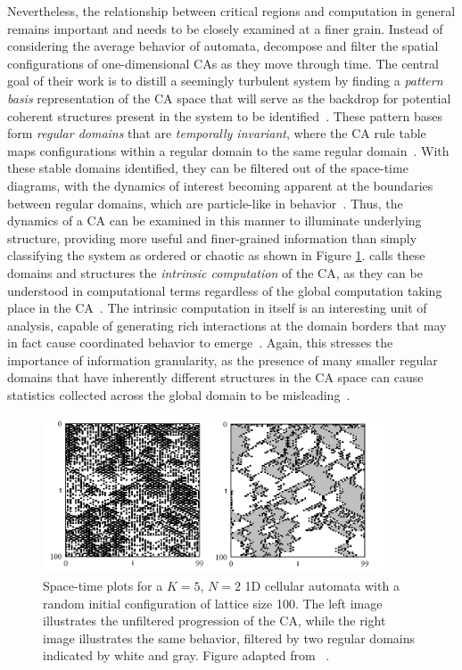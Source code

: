 \documentclass[a4paper,11pt]{report}
\begin{document}
Nevertheless, the relationship between critical regions and computation in general remains important and needs to be closely examined at a finer grain. Instead of considering the average behavior of automata, \citeauthor{cr93} decompose and filter the spatial configurations of one-dimensional CAs as they move through time. The central goal of their work is to distill a seemingly turbulent system by finding a \textit{pattern basis} representation of the CA space that will serve as the backdrop for potential coherent structures present in the system to be identified~\cite{cr93}. These pattern bases form \textit{regular domains} that are \textit{temporally invariant}, where the CA rule table maps configurations within a regular domain to the same regular domain~\cite{mi96}. With these stable domains identified, they can be filtered out of the space-time diagrams, with the dynamics of interest becoming apparent at the boundaries between regular domains, which are particle-like in behavior~\cite{cr93}. Thus, the dynamics of a CA can be examined in this manner to illuminate underlying structure, providing more useful and finer-grained information than simply classifying the system as ordered or chaotic as shown in Figure \ref{fig:ca_filter}. \citeauthor{cr93} calls these domains and structures the \textit{intrinsic computation} of the CA, as they can be understood in computational terms regardless of the global computation taking place in the CA~\cite{mi96}. The intrinsic computation in itself is an interesting unit of analysis, capable of generating rich interactions at the domain borders that may in fact cause coordinated behavior to emerge~\cite{cr95}. Again, this stresses the importance of information granularity, as the presence of many smaller regular domains that have inherently different structures in the CA space can cause statistics collected across the global domain to be misleading~\cite{cr93}.

\begin{figure}[htp]
\centering
\includegraphics[width=0.9\textwidth]{cr93_fig3.png}
\caption[Filtered CA Behavior]{
Space-time plots for a $K=5$, $N=2$ 1D cellular automata with a random initial configuration of lattice size 100. The left image illustrates the unfiltered progression of the CA, while the right image illustrates the same behavior, filtered by two regular domains indicated by white and gray. Figure adapted from \citeauthor{cr93}~\cite{cr93}.
}
\label{fig:ca_filter}
\end{figure}
\end{document}
